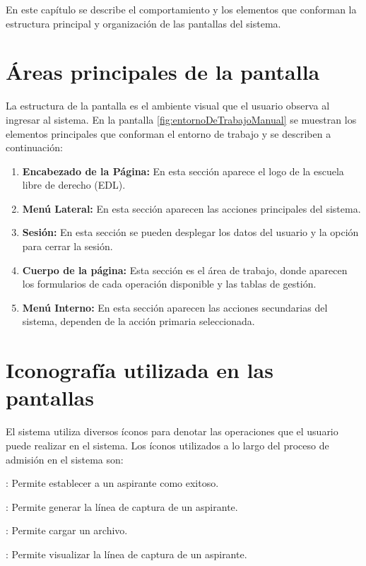 En este capítulo se describe el comportamiento y los elementos que conforman la estructura principal y organización de las pantallas del sistema. 


\section{Áreas principales de la pantalla}

La estructura de la pantalla es el ambiente visual que el usuario observa al ingresar al sistema. En la pantalla \ref{fig:entornoDeTrabajoManual} se muestran los elementos 
principales que conforman el entorno de trabajo y se describen a continuación:
%
\begin{enumerate}
	\item \textbf{Encabezado de la Página:} En esta sección aparece el logo de la escuela libre de derecho (EDL).
	\item \textbf{Menú Lateral:} En esta sección aparecen las acciones principales del sistema.
	\item \textbf{Sesión:}  En esta sección se pueden desplegar los datos del usuario y la opción para cerrar la sesión.
	\item \textbf{Cuerpo de la página:} Esta sección es el área de trabajo, donde aparecen los formularios de cada operación disponible y las tablas de gestión.
	\item \textbf{Menú Interno:} En esta sección aparecen las acciones secundarias del sistema, dependen de la acción primaria seleccionada.
\end{enumerate} 
\newpage
{}


%
\section{Iconografía utilizada en las pantallas}

El sistema utiliza diversos íconos para denotar las operaciones que el usuario puede realizar en el sistema. Los íconos utilizados a lo largo del proceso de admisión en el sistema son: 

\newcommand{\btnBorrar}{\imgInline{Iconos/borrar.png}}
	
\begin{Citemize}
	\item \IUbtAsistencia: Permite establecer a un aspirante como exitoso.
	\item \IUbtArchivo: Permite generar la línea de captura de un aspirante.
	\item \IUbtUpload: Permite cargar un archivo.
	\item \IUbtPDF: Permite visualizar la línea de captura de un aspirante.
	
\end{Citemize}

